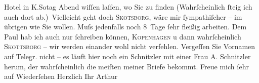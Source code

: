 \begin{ledgroupsized}[t]{13cm}
               Hotel in K.So{\geminationn}tag Abend wiſſen laſſen, wo Sie zu
               finden (Wahrſcheinlich ſteig ich {\pb}auch dort
               ab.) Vielleicht geht doch \textsc{Skotsborg}, wäre mir ſympathiſcher – im übrigen wie Sie wollen. Muſs jedenfalls noch
               8 Tage ſehr fleißig arbeiten. Dem Paul hab
               ich auch nur ſchreiben können, \textsc{Kopenhagen} u dann wahrſcheinlich \textsc{Skottsborg} – wir werden einander wohl nicht verfehlen. Vergeſſen Sie Vornamen auf Telegr.
               nicht – es läuft hier noch ein Schnitzler mit
               einer Frau A. Schnitzler herum, der
               wahrſcheinlich die meiſten meiner Briefe bekommt. Freue mich ſehr auf Wiederſehen\pend
           \pstart Herzlich Ihr \spacefill\mbox{Arthur}\pend{}\endnumbering{}\end{ledgroupsized}  \newcommand{\dateiname}{L00571}\newcommand{\titel}{Arthur Schnitzler an Richard Beer-Hofmann, 29. 7. 1896}\newcommand{\editorInnen}{Martin Anton Müller und Gerd-Hermann Susen}
      